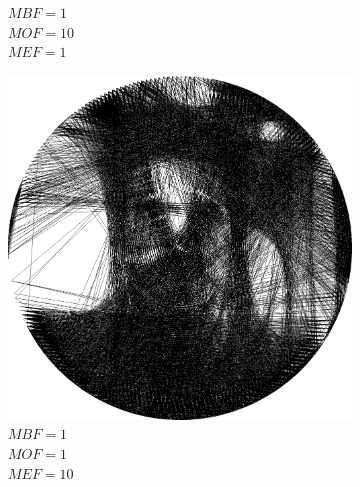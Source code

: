 \begin{figure}[H]
\begin{subfigure}{0.32\textwidth}
        \caption{\(MBF = 1\) \\ \(MOF = 10\) \\ \(MEF = 1\)}
        \label{mine-param-taco-thread-e}
    \end{subfigure}
    \begin{subfigure}{0.32\textwidth}
        \centering
        \includegraphics[width = \textwidth]{img/4-mine/taco-thread/taco_e_i3000_c20_inv0_bg1_obj1_ed10.png}
        \caption{\(MBF = 1\) \\ \(MOF = 1\) \\ \(MEF = 10\)}
        \label{mine-param-taco-thread-f}
    \end{subfigure}\\
    \begin{subfigure}{0.32\textwidth}
        \centering

\end{subfigure}
\end{figure}

